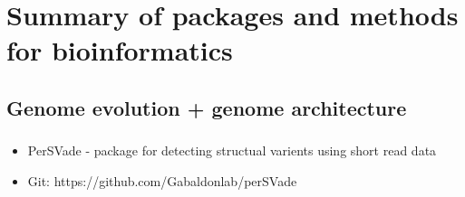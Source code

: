 \documentclass[document.tex]{subfiles}
\begin{document}
\chapter{Summary of packages and methods for bioinformatics}

\label{day:2023-02-15}
\section*{Genome evolution + genome architecture}

\subsection{}
\begin{itemize}
    \item PerSVade - package for detecting structual varients using short read data
    \item Git: https://github.com/Gabaldonlab/perSVade 
    \end{itemize}

\bib{}
\end{document}
